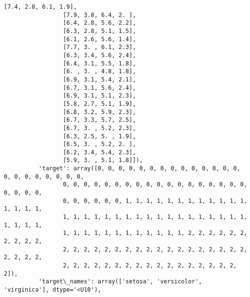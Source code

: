 \documentclass[11pt]{article}
\begin{document}
\begin{Verbatim}[commandchars=\\\{\}]
                 [7.4, 2.8, 6.1, 1.9],
                 [7.9, 3.8, 6.4, 2. ],
                 [6.4, 2.8, 5.6, 2.2],
                 [6.3, 2.8, 5.1, 1.5],
                 [6.1, 2.6, 5.6, 1.4],
                 [7.7, 3. , 6.1, 2.3],
                 [6.3, 3.4, 5.6, 2.4],
                 [6.4, 3.1, 5.5, 1.8],
                 [6. , 3. , 4.8, 1.8],
                 [6.9, 3.1, 5.4, 2.1],
                 [6.7, 3.1, 5.6, 2.4],
                 [6.9, 3.1, 5.1, 2.3],
                 [5.8, 2.7, 5.1, 1.9],
                 [6.8, 3.2, 5.9, 2.3],
                 [6.7, 3.3, 5.7, 2.5],
                 [6.7, 3. , 5.2, 2.3],
                 [6.3, 2.5, 5. , 1.9],
                 [6.5, 3. , 5.2, 2. ],
                 [6.2, 3.4, 5.4, 2.3],
                 [5.9, 3. , 5.1, 1.8]]),
          'target': array([0, 0, 0, 0, 0, 0, 0, 0, 0, 0, 0, 0, 0, 0, 0, 0, 0, 0, 0, 0, 0, 0,
                 0, 0, 0, 0, 0, 0, 0, 0, 0, 0, 0, 0, 0, 0, 0, 0, 0, 0, 0, 0, 0, 0,
                 0, 0, 0, 0, 0, 0, 1, 1, 1, 1, 1, 1, 1, 1, 1, 1, 1, 1, 1, 1, 1, 1,
                 1, 1, 1, 1, 1, 1, 1, 1, 1, 1, 1, 1, 1, 1, 1, 1, 1, 1, 1, 1, 1, 1,
                 1, 1, 1, 1, 1, 1, 1, 1, 1, 1, 1, 1, 2, 2, 2, 2, 2, 2, 2, 2, 2, 2,
                 2, 2, 2, 2, 2, 2, 2, 2, 2, 2, 2, 2, 2, 2, 2, 2, 2, 2, 2, 2, 2, 2,
                 2, 2, 2, 2, 2, 2, 2, 2, 2, 2, 2, 2, 2, 2, 2, 2, 2, 2]),
          'target\_names': array(['setosa', 'versicolor', 'virginica'], dtype='<U10'),

\end{Verbatim}
\end{document}
